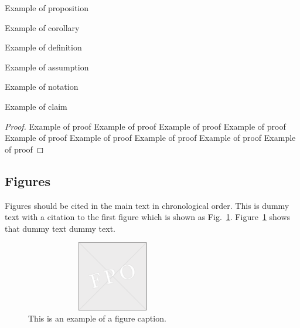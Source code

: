 \documentclass{isabec} %
\begin{document}
\begin{proposition}
Example of proposition
\end{proposition}

\begin{corollary}
Example of corollary
\end{corollary}

\begin{definition}
Example of definition
\end{definition}

\begin{assumption}
Example of assumption
\end{assumption}

\begin{notation}
Example of notation
\end{notation}

\begin{claim}
Example of claim
\end{claim}

\begin{proof}
Example of proof Example of proof Example of proof Example of proof Example of proof Example of proof Example of proof Example of proof Example of proof 
\end{proof}

\subsection{Figures}
Figures should be cited in the main text in chronological order. This is dummy text with a citation to the first figure which is shown as Fig.~\ref{fig1}. Figure~\ref{fig1} shows that dummy text dummy text.

\begin{figure}[h]
\begin{center}
\includegraphics[width=3in,height=1.2in]{fpo}%
\end{center}
\caption{This is an example of a figure caption.}
\label{fig1}
\end{figure}\vspace*{-12pt}
\end{document}
